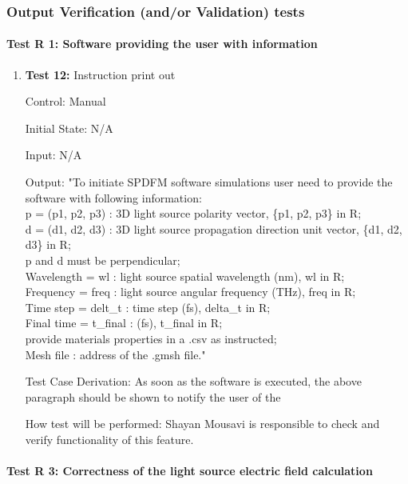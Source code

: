 \documentclass[12pt, titlepage]{article}
\begin{document}
\subsubsection{Output Verification (and/or Validation) tests}
\paragraph{Test R 1: Software providing the user with information }

\begin{enumerate}
	
	\item{\textbf{Test 12:} Instruction print out\\}
	
	Control: Manual
	
	Initial State: N/A
	
	Input: N/A
	
	Output: 
	"To initiate SPDFM software simulations user need to provide the software with following information:\\
	p = (p1, p2, p3) : 3D light source polarity vector, \{p1, p2, p3\} in R;\\
	d = (d1, d2, d3) : 3D light source propagation direction unit vector, \{d1, d2, d3\} in R;\\
	p and d must be perpendicular;\\ 
	Wavelength = wl : light source spatial wavelength (nm), wl in R;\\
	Frequency = freq : light source angular frequency (THz), freq in R;\\
	Time step = delt\_t : time step (fs), delta\_t in R;\\
	Final time = t\_final : (fs), t\_final in R;\\
	provide materials properties in a .csv as instructed;\\
	Mesh file : address of the .gmsh file."
	
	Test Case Derivation: As soon as the software is executed, the above paragraph should be shown to notify the user of the 
	
	How test will be performed: Shayan Mousavi is responsible to check and verify functionality of this feature.   
	
	
\end{enumerate}



\paragraph{Test R 3: Correctness of the light source electric field calculation}
\end{document}
